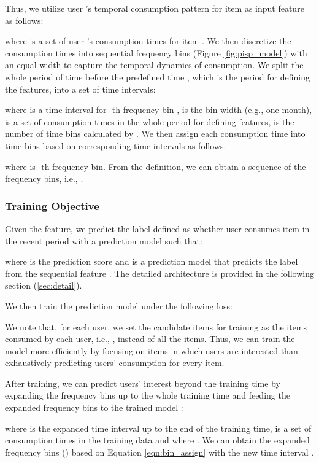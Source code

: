 \documentclass[sigconf]{acmart}
\begin{document}
Thus, we utilize user 's temporal consumption pattern for item  as input feature as follows:

where  is a set of user 's consumption times for item .
We then discretize the consumption times  into sequential frequency bins (Figure \ref{fig:pisp_model}) with an equal width  to capture the temporal dynamics of consumption. We split the whole period of time before the predefined time , which is the period for defining the features, into a set of time intervals:

where  is a time interval for -th frequency bin ,  is the bin width (e.g., one month),  is a set of consumption times in the whole period for defining features,  is the number of time bins calculated by .
We then assign each consumption time  into time bins based on corresponding time intervals as follows:

where  is -th frequency bin. From the definition, we can obtain a sequence of the frequency bins, i.e., . 

\subsubsection{\textbf{Training Objective}}
Given the feature, we predict the label  defined as whether user  consumes item  in the recent period with a prediction model such that:

where  is the prediction score and  is a prediction model that predicts the label  from the sequential feature . The detailed architecture is provided in the following section (\cref{sec:detail}).

We then train the prediction model  under the following loss:

We note that, for each user, we set the candidate items for training as the items consumed by each user, i.e., , instead of all the items. Thus, we can train the model more efficiently by focusing on items in which users are interested than exhaustively predicting users' consumption for every item.

After training, we can predict users' interest beyond the training time by expanding the frequency bins up to the whole training time and feeding the expanded frequency bins to the trained model :

where  is the expanded time interval up to the end of the training time,  is a set of consumption times in the training data  and  where . We can obtain the expanded frequency bins () based on Equation \ref{eqn:bin_assign} with the new time interval .
\end{document}
